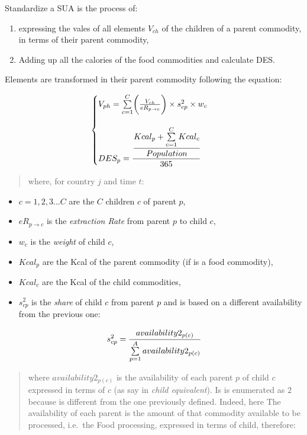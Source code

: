 \documentclass[]{article}
\providecommand{\tightlist}{%
  \setlength{\itemsep}{0pt}\setlength{\parskip}{0pt}}
\begin{document}
Standardize a SUA is the process of:

\begin{enumerate}
\def\labelenumi{\alph{enumi}.}
\tightlist
\item
  expressing the vales of all elements \(V_{ch}\) of the children of a
  parent commodity, in terms of their parent commodity,
\item
  Adding up all the calories of the food commodities and calculate DES.
\end{enumerate}

Elements are transformed in their parent commodity following the
equation:

\begin{equation}
\begin{cases}
\label{eq:Food Processing}
 V_{ph} = \sum \limits_{c=1}^C\biggl(\frac{V_{ch}}{eR_{p\to c}}\biggr)\times s^{2}_{cp}\times w_{c}\\
  \\
 DES_{p} =  \cfrac{\cfrac{Kcal_{p} + \sum \limits_{c=1}^C Kcal_{c}}{Population}}{365}
\end{cases}
\end{equation}

\begin{quote}
where, for country \(j\) and time \(t\):
\end{quote}

\begin{itemize}
\tightlist
\item
  \(c = 1,2,3...C\) are the \(C\) children \(c\) of parent \(p\),
\item
  \(eR_{p\to c}\) is the \emph{extraction Rate} from parent \(p\) to
  child \(c\),
\item
  \(w_{c}\) is the \emph{weight} of child \(c\),
\item
  \(Kcal_{p}\) are the Kcal of the parent commodity (if is a food
  commodity),
\item
  \(Kcal_{c}\) are the Kcal of the child commodities,
\item
  \(s^{2}_{cp}\) is the \emph{share} of child \(c\) from parent \(p\)
  and is based on a different availability from the previous one:
\end{itemize}

\begin{equation}
\label{eq:shares}
s^{2}_{cp} = \cfrac{availability2_{p(c)}}{\sum \limits_{p=1}^A{availability2_{p(c)}}}
\end{equation}

\begin{quote}
where \(availability2_{p(c)}\) is the availability of each parent \(p\)
of child \(c\) expressed in terms of \(c\) (as say in \emph{child
equivalent}). Is is enumerated as \(2\) because is different from the
one previously defined. Indeed, here The availability of each parent is
the amount of that commodity available to be processed, i.e.~the Food
processing, expressed in terms of child, therefore:
\end{quote}
\end{document}
